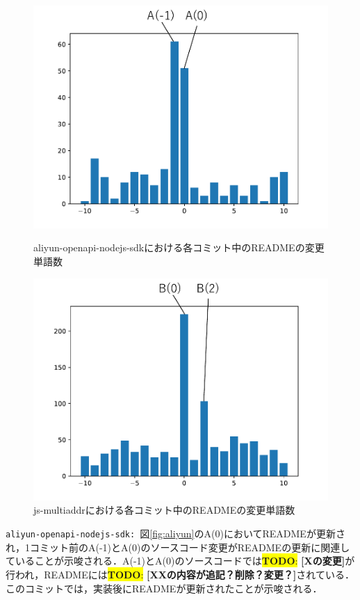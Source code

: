 \documentclass[uplatex,dvipdfmx,a4paper,twocolumn,base=11pt,jbase=11pt,ja=standard]{bxjsarticle}  %
\newcommand{\todo}[1]{\colorbox{yellow}{{\bf TODO}:}{\color{red} {\textbf{[#1]}}}}
\begin{document}
\begin{figure}[t]
\begin{center}
\includegraphics[width=0.7\linewidth]{use_aliyun.pdf}
\vspace{-5mm}
\caption{aliyun-openapi-nodejs-sdkにおける各コミット中のREADMEの変更単語数}
\label{fig:aliyun}
\end{center}

\vspace{-8mm}

\begin{center}
\includegraphics[width=0.7\linewidth]{use_js.pdf}
\caption{js-multiaddrにおける各コミット中のREADMEの変更単語数}
\label{fig:multiaddr}
\end{center}
\end{figure}

\noindent\texttt{aliyun-openapi-nodejs-sdk: }図\ref{fig:aliyun}のA(0)においてREADMEが更新され，1コミット前のA(-1)とA(0)のソースコード変更がREADMEの更新に関連していることが示唆される．A(-1)とA(0)のソースコードでは\todo{Xの変更}が行われ，READMEには\todo{XXの内容が追記？削除？変更？}されている．このコミットでは，実装後にREADMEが更新されたことが示唆される．
\end{document}
